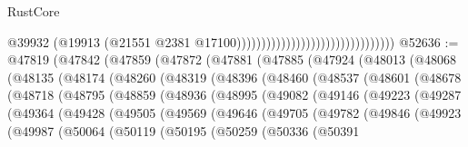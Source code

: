 \begin{lexlean}{RustCore}
\begin{coremodule}
                                                                @39932
                                                                (@19913
                                                                  (@21551
                                                                    @2381
                                                                    @17100))))))))))))))))))))))))))))))))
@52636 := @47819
    (@47842
      (@47859
        (@47872
          (@47881
            (@47885
              (@47924
                (@48013
                  (@48068
                    (@48135
                      (@48174
                        (@48260
                          (@48319
                            (@48396
                              (@48460
                                (@48537
                                  (@48601
                                    (@48678
                                      (@48718
                                        (@48795
                                          (@48859
                                            (@48936
                                              (@48995
                                                (@49082
                                                  (@49146
                                                    (@49223
                                                      (@49287
                                                        (@49364
                                                          (@49428
                                                            (@49505
                                                              (@49569
                                                                (@49646
                                                                  (@49705
                                                                    (@49782
                                                                      (@49846
                                                                        (@49923
                                                                          (@49987
                                                                            (@50064
                                                                              (@50119
                                                                                (@50195
                                                                                  (@50259
                                                                                    (@50336
                                                                                      (@50391

\end{coremodule}
\end{lexlean}
